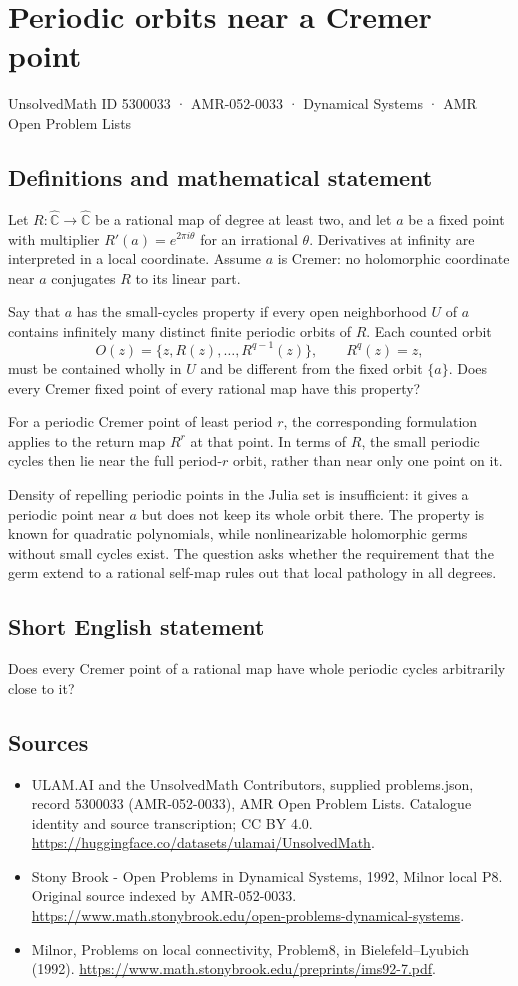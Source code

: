 \documentclass[11pt,a4paper]{article}
\begin{document}
\section*{Periodic orbits near a Cremer point}\label{5300033}
{\small UnsolvedMath ID 5300033 · AMR-052-0033 · Dynamical Systems · AMR Open Problem Lists}
\subsection{Definitions and mathematical statement}
Let $R:\widehat{\mathbb C}\to\widehat{\mathbb C}$ be a rational map of
degree at least two, and let $a$ be a fixed point with multiplier
$R'(a)=e^{2\pi i\theta}$ for an irrational $\theta$. Derivatives at
infinity are interpreted in a local coordinate. Assume $a$ is Cremer:
no holomorphic coordinate near $a$ conjugates $R$ to its linear part.

Say that $a$ has the small-cycles property if every open neighborhood
$U$ of $a$ contains infinitely many distinct finite periodic orbits
of $R$. Each counted orbit
\[
 O(z)=\{z,R(z),\ldots,R^{q-1}(z)\},\qquad R^q(z)=z,
\]
must be contained wholly in $U$ and be different from the fixed orbit
$\{a\}$. Does every Cremer fixed point of every rational map have this
property?

For a periodic Cremer point of least period $r$, the corresponding
formulation applies to the return map $R^r$ at that point. In terms
of $R$, the small periodic cycles then lie near the full period-$r$
orbit, rather than near only one point on it.

Density of repelling periodic points in the Julia set is insufficient:
it gives a periodic point near $a$ but does not keep its whole orbit
there. The property is known for quadratic polynomials, while
nonlinearizable holomorphic germs without small cycles exist. The
question asks whether the requirement that the germ extend to a
rational self-map rules out that local pathology in all degrees.
\subsection{Short English statement}
Does every Cremer point of a rational map have whole periodic cycles arbitrarily close to it?
\subsection{Sources}
\begin{itemize}
\item[S1] ULAM.AI and the UnsolvedMath Contributors, supplied problems.json, record 5300033 (AMR-052-0033), AMR Open Problem Lists. Catalogue identity and source transcription; CC BY 4.0.
\url{https://huggingface.co/datasets/ulamai/UnsolvedMath}.
\item[S2] Stony Brook - Open Problems in Dynamical Systems, 1992, Milnor local P8. Original source indexed by AMR-052-0033.
\url{https://www.math.stonybrook.edu/open-problems-dynamical-systems}.
\item[S3] Milnor, Problems on local connectivity, Problem8, in Bielefeld–Lyubich (1992).
\url{https://www.math.stonybrook.edu/preprints/ims92-7.pdf}.
\end{itemize}
\end{document}
